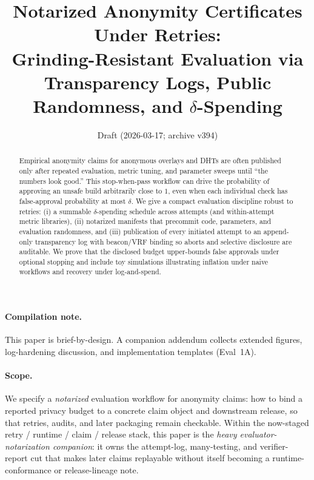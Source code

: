 \documentclass[11pt]{article}
\title{Notarized Anonymity Certificates Under Retries:\\
Grinding-Resistant Evaluation via Transparency Logs, Public Randomness, and \texorpdfstring{$\delta$}{delta}-Spending}
\author{}
\date{Draft (2026-03-17; archive v394)}
\begin{document}
\maketitle

\begin{abstract}
Empirical anonymity claims for anonymous overlays and DHTs are often published only after repeated evaluation, metric tuning, and parameter sweeps until ``the numbers look good.''
This stop-when-pass workflow can drive the probability of approving an unsafe build arbitrarily close to $1$, even when each individual check has false-approval probability at most $\delta$.
We give a compact evaluation discipline robust to retries: (i) a summable $\delta$-spending schedule across attempts (and within-attempt metric libraries), (ii) notarized manifests that precommit code, parameters, and evaluation randomness, and (iii) publication of every initiated attempt to an append-only transparency log with beacon/VRF binding so aborts and selective disclosure are auditable.
We prove that the disclosed budget upper-bounds false approvals under optional stopping and include toy simulations illustrating inflation under naive workflows and recovery under log-and-spend.
\end{abstract}

\paragraph{Compilation note.}
This paper is brief-by-design. A companion addendum collects extended figures, log-hardening discussion, and implementation templates (Eval~1A).\cite{series:evalnotaryaddendum}

\paragraph{Scope.}
We specify a \emph{notarized} evaluation workflow for anonymity claims: how to bind a reported privacy budget to a concrete claim object and downstream release, so that retries, audits, and later packaging remain checkable.
Within the now-staged retry / runtime / claim / release stack, this paper is the \emph{heavy evaluator-notarization companion}: it owns the attempt-log, many-testing, and verifier-report cut that makes later claims replayable without itself becoming a runtime-conformance or release-lineage note.
\end{document}
